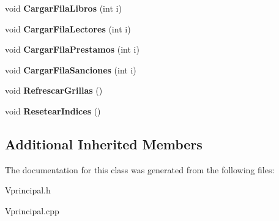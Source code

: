 \begin{DoxyCompactItemize}
\item 
void {\bfseries Cargar\+Fila\+Libros} (int i)\hypertarget{class_vprincipal_ae4929feeacf6400b3ba32c0e5210c206}{}\label{class_vprincipal_ae4929feeacf6400b3ba32c0e5210c206}

\item 
void {\bfseries Cargar\+Fila\+Lectores} (int i)\hypertarget{class_vprincipal_a5caa1e5dc35fdfd92de23e5b0475ec89}{}\label{class_vprincipal_a5caa1e5dc35fdfd92de23e5b0475ec89}

\item 
void {\bfseries Cargar\+Fila\+Prestamos} (int i)\hypertarget{class_vprincipal_a1f2b9aecf8f5fde9fae821e3e7624fa4}{}\label{class_vprincipal_a1f2b9aecf8f5fde9fae821e3e7624fa4}

\item 
void {\bfseries Cargar\+Fila\+Sanciones} (int i)\hypertarget{class_vprincipal_a40ecae5c4876a12cb9dd34346b7c94bc}{}\label{class_vprincipal_a40ecae5c4876a12cb9dd34346b7c94bc}

\item 
void {\bfseries Refrescar\+Grillas} ()\hypertarget{class_vprincipal_acb3e9dd8ca0248937f0f53778319ec18}{}\label{class_vprincipal_acb3e9dd8ca0248937f0f53778319ec18}

\item 
void {\bfseries Resetear\+Indices} ()\hypertarget{class_vprincipal_ada88b257db7710f9ab16582c185b36a3}{}\label{class_vprincipal_ada88b257db7710f9ab16582c185b36a3}

\end{DoxyCompactItemize}
\subsection*{Additional Inherited Members}


The documentation for this class was generated from the following files\+:\begin{DoxyCompactItemize}
\item 
Vprincipal.\+h\item 
Vprincipal.\+cpp\end{DoxyCompactItemize}
